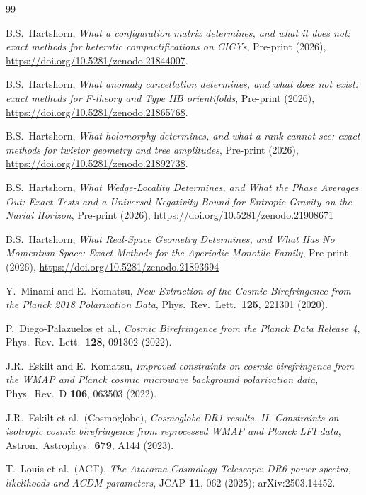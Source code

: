 \documentclass[11pt,a4paper]{article}
\theoremstyle{plain}
\theoremstyle{definition}
\begin{document}
\begin{thebibliography}{99}

B.S.~Hartshorn,
\emph{What a configuration matrix determines, and what it does not: exact
methods for heterotic compactifications on CICYs},
Pre-print (2026), \url{https://doi.org/10.5281/zenodo.21844007}.

B.S.~Hartshorn,
\emph{What anomaly cancellation determines, and what does not exist: exact
methods for F-theory and Type IIB orientifolds},
Pre-print (2026), \url{https://doi.org/10.5281/zenodo.21865768}.

B.S.~Hartshorn,
\emph{What holomorphy determines, and what a rank cannot see: exact methods
for twistor geometry and tree amplitudes},
Pre-print (2026), \url{https://doi.org/10.5281/zenodo.21892738}.

B.S.~Hartshorn,
\emph{What Wedge-Locality Determines, and What the Phase Averages Out: Exact Tests and a Universal Negativity Bound for Entropic Gravity on the Nariai Horizon},
Pre-print (2026),
\url{https://doi.org/10.5281/zenodo.21908671}

B.S.~Hartshorn,
\emph{What Real-Space Geometry Determines, and What Has No Momentum Space: Exact Methods for the Aperiodic Monotile Family}, 
Pre-print (2026),
\url{https://doi.org/10.5281/zenodo.21893694}

Y.~Minami and E.~Komatsu,
\emph{New Extraction of the Cosmic Birefringence from the Planck 2018
Polarization Data},
Phys.\ Rev.\ Lett.\ \textbf{125}, 221301 (2020).

P.~Diego-Palazuelos et al.,
\emph{Cosmic Birefringence from the Planck Data Release 4},
Phys.\ Rev.\ Lett.\ \textbf{128}, 091302 (2022).

J.R.~Eskilt and E.~Komatsu,
\emph{Improved constraints on cosmic birefringence from the WMAP and
Planck cosmic microwave background polarization data},
Phys.\ Rev.\ D \textbf{106}, 063503 (2022).

J.R.~Eskilt et al.\ (Cosmoglobe),
\emph{Cosmoglobe DR1 results. II. Constraints on isotropic cosmic
birefringence from reprocessed WMAP and Planck LFI data},
Astron.\ Astrophys.\ \textbf{679}, A144 (2023).

T.~Louis et al.\ (ACT),
\emph{The Atacama Cosmology Telescope: DR6 power spectra, likelihoods
and $\Lambda$CDM parameters},
JCAP \textbf{11}, 062 (2025); arXiv:2503.14452.


\end{thebibliography}
\end{document}
